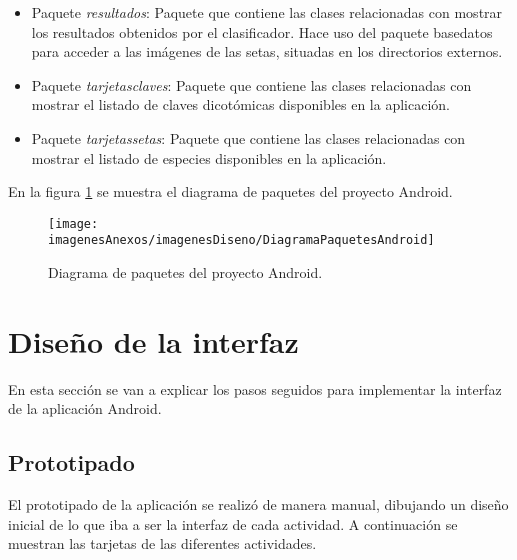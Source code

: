 \begin{itemize}
	\item Paquete \textit{resultados}: Paquete que contiene las clases relacionadas con mostrar los resultados obtenidos por el clasificador. Hace uso del paquete basedatos para acceder a las imágenes de las setas, situadas en los directorios externos.
	
	
	\item Paquete \textit{tarjetasclaves}: Paquete que contiene las clases relacionadas con mostrar el listado de claves dicotómicas disponibles en la aplicación.
	
	
	\item Paquete \textit{tarjetassetas}: Paquete que contiene las clases relacionadas con mostrar el listado de especies disponibles en la aplicación.
	
\end{itemize}

En la figura \ref{figDiagramaPaquetesAndroid} se muestra el diagrama de paquetes del proyecto Android. 
\begin{figure}[h]
    \begin{center}%
        \begin{center}%
          \texttt{[image: imagenesAnexos/imagenesDiseno/DiagramaPaquetesAndroid]}%
          \caption{Diagrama de paquetes del proyecto Android.}%
          \label{figDiagramaPaquetesAndroid}%
        \end{center}%
  	\end{center}%
\end{figure}%

\section{Diseño de la interfaz}

En esta sección se van a explicar los pasos seguidos para implementar la interfaz de la aplicación Android.

\subsection{Prototipado}

El prototipado de la aplicación se realizó de manera manual, dibujando un diseño inicial de lo que iba a ser la interfaz de cada actividad. A continuación se muestran las tarjetas de las diferentes actividades.